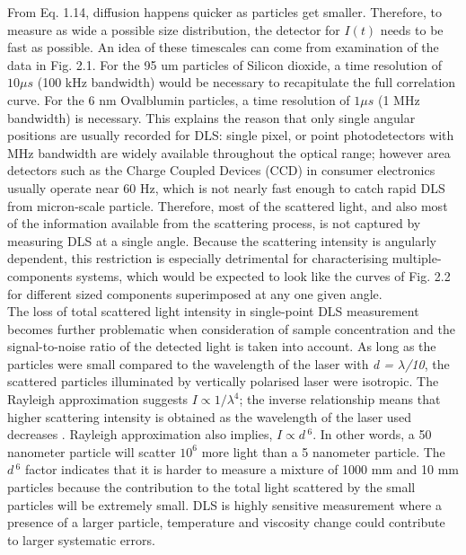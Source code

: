 From Eq. 1.14, diffusion happens quicker as particles get smaller. Therefore, to measure as wide a possible size distribution, the detector for $I(t)$ needs to be fast as possible. An idea of these timescales can come from examination of the data in Fig. 2.1. For the 95 um particles of Silicon dioxide, a time resolution of $10 \mu s$ (100 kHz bandwidth) would be necessary to recapitulate the full correlation curve. For the 6 nm Ovalblumin particles, a time resolution of $1 \mu s$ (1 MHz bandwidth) is necessary.  This explains the reason that only single angular positions are usually recorded for DLS: single pixel, or point photodetectors with MHz bandwidth are widely available throughout the optical range; however area detectors such as the Charge Coupled Devices (CCD) in consumer electronics usually operate near 60 Hz, which is not nearly fast enough to catch rapid DLS from micron-scale particle. Therefore, most of the scattered light, and also most of the information available from the scattering process, is not captured by measuring DLS at a single angle.  Because the scattering intensity is angularly dependent, this restriction is especially detrimental for characterising multiple-components systems, which would be expected to look like the curves of Fig. 2.2 for different sized components superimposed at any one given angle. \\



The loss of total scattered light intensity in single-point DLS measurement becomes further problematic when consideration of sample concentration and the signal-to-noise ratio of the detected light is taken into account. As long as the particles were small compared to the wavelength of the laser with {\it d = $\lambda$/10}, the scattered particles illuminated by vertically polarised laser were isotropic. The Rayleigh approximation suggests $I \propto 1/\lambda^4$; the inverse relationship means that higher scattering intensity is obtained as the wavelength of the laser used decreases \citep{Reif}. Rayleigh approximation also implies, $I \propto d\,^6$. In other words, a 50 nanometer particle will scatter $10^6$ more light than a 5 nanometer particle. The $d\, ^6$ factor indicates that it is harder to measure a mixture of 1000 mm and 10 mm particles because the contribution to the total light scattered by the small particles will be extremely small. DLS is highly sensitive measurement where a presence of a larger particle, temperature and viscosity change could contribute to larger systematic errors. \\

